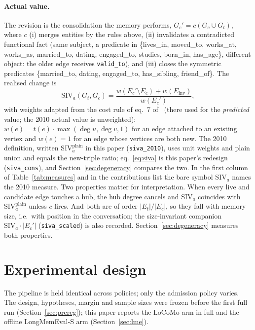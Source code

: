 \documentclass{ceurart}
\newcommand{\Gc}{G_c}
\newcommand{\Gt}{G_t}
\newcommand{\Gcp}{G_c'}
\newcommand{\Ec}{E_c}
\newcommand{\Et}{E_t}
\newcommand{\Ecp}{E_c'}
\newcommand{\SIVa}{\mathrm{SIV}_a}
\newcommand{\SIVaplain}{\mathrm{SIV}_a^{\mathrm{plain}}}
\newcommand{\degv}{\deg}
\newcommand{\cons}{c}
\newcommand{\code}[1]{\texttt{#1}}
\begin{document}
\paragraph{Actual value.} The revision is the consolidation the memory performs, $\Gcp=\cons(\Gc\cup\Gt)$, where $\cons$ (i) merges entities by the rules above, (ii) invalidates a contradicted functional fact (same subject, a predicate in \{lives\_in, moved\_to, works\_at, works\_as, married\_to, dating, engaged\_to, studies, born\_in, has\_age\}, different object: the older edge receives \code{valid\_to}), and (iii) closes the symmetric predicates \{married\_to, dating, engaged\_to, has\_sibling, friend\_of\}. The realised change is
\begin{equation}
  \SIVa(\Gt,\Gc)=\frac{w(\Ecp\setminus\Ec)+w(E_{\mathrm{inv}})}{w(\Ecp)},
  \label{eq:siva}
\end{equation}
with weights adapted from the cost rule of eq.~7 of~\cite{alsaffar2010siv} (there used for the \emph{predicted} value; the 2010 actual value is unweighted): $w(e)=t(e)\cdot\max(\degv u,\degv v,1)$ for an edge attached to an existing vertex and $w(e)=1$ for an edge whose vertices are both new. The 2010 definition, written $\SIVaplain$ in this paper (\code{siva\_2010}), uses unit weights and plain union and equals the new-triple ratio; eq.~\eqref{eq:siva} is this paper's redesign (\code{siva\_cons}), and Section~\ref{sec:degeneracy} compares the two. In the first column of Table~\ref{tab:measures} and in the contributions list the bare symbol $\SIVa$ names the 2010 measure. Two properties matter for interpretation. When every live and candidate edge touches a hub, the hub degree cancels and $\SIVa$ coincides with $\SIVaplain$ unless $\cons$ fires. And both are of order $|\Et|/|\Ec|$, so they fall with memory size, i.e.\ with position in the conversation; the size-invariant companion $\SIVa\cdot|\Ecp|$ (\code{siva\_scaled}) is also recorded. Section~\ref{sec:degeneracy} measures both properties.

\section{Experimental design}
\label{sec:design}

The pipeline is held identical across policies; only the admission policy varies. The design, hypotheses, margin and sample sizes were frozen before the first full run (Section~\ref{sec:prereg}); this paper reports the LoCoMo arm in full and the offline LongMemEval-S arm (Section~\ref{sec:lme}).
\end{document}
